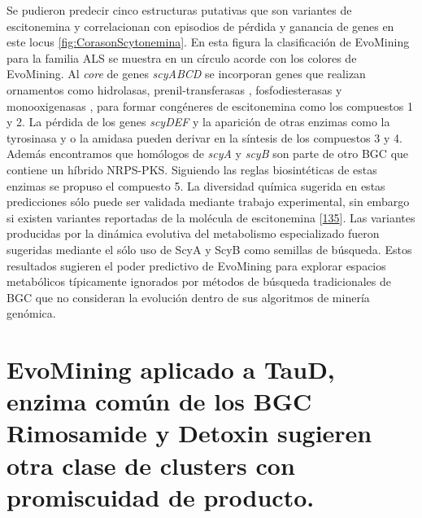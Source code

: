 \documentclass[12pt,twoside]{reedthesis}
\begin{document}
  Se pudieron predecir cinco estructuras putativas que son variantes de
  escitonemina y correlacionan con episodios de pérdida y ganancia de
  genes en este locus \autoref{fig:CorasonScytonemina}. En esta figura la
  clasificación de EvoMining para la familia ALS se muestra en un círculo
  acorde con los colores de EvoMining. Al \emph{core} de genes
  \emph{scyABCD} se incorporan genes que realizan ornamentos como
  hidrolasas, prenil-transferasas , fosfodiesterasas y monooxigenasas ,
  para formar congéneres de escitonemina como los compuestos 1 y 2. La
  pérdida de los genes \emph{scyDEF} y la aparición de otras enzimas como
  la tyrosinasa y o la amidasa pueden derivar en la síntesis de los
  compuestos 3 y 4. Además encontramos que homólogos de \emph{scyA} y
  \emph{scyB} son parte de otro BGC que contiene un híbrido NRPS-PKS.
  Siguiendo las reglas biosintéticas de estas enzimas se propuso el
  compuesto 5. La diversidad química sugerida en estas predicciones sólo
  puede ser validada mediante trabajo experimental, sin embargo si existen
  variantes reportadas de la molécula de escitonemina
  {[}\protect\hyperlink{ref-grant_scytonemin-imine_2013}{135}{]}. Las
  variantes producidas por la dinámica evolutiva del metabolismo
  especializado fueron sugeridas mediante el sólo uso de ScyA y ScyB como
  semillas de búsqueda. Estos resultados sugieren el poder predictivo de
  EvoMining para explorar espacios metabólicos típicamente ignorados por
  métodos de búsqueda tradicionales de BGC que no consideran la evolución
  dentro de sus algoritmos de minería genómica.
  
  \section{EvoMining aplicado a TauD, enzima común de los BGC Rimosamide y
  Detoxin sugieren otra clase de clusters con promiscuidad de
  producto.}\label{evomining-aplicado-a-taud-enzima-comun-de-los-bgc-rimosamide-y-detoxin-sugieren-otra-clase-de-clusters-con-promiscuidad-de-producto.}
  
\end{document}
